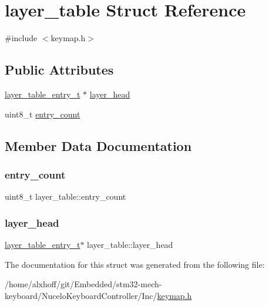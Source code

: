 \hypertarget{structlayer__table}{}\section{layer\+\_\+table Struct Reference}
\label{structlayer__table}


{\ttfamily \#include $<$keymap.\+h$>$}

\subsection*{Public Attributes}
\begin{DoxyCompactItemize}
\item 
\hyperlink{keymap_8h_ab39f612aa4dc85545562fc906ed5f100}{layer\+\_\+table\+\_\+entry\+\_\+t} $\ast$ \hyperlink{structlayer__table_aca57f81e89c42abcc37efffb16144630}{layer\+\_\+head}
\item 
uint8\+\_\+t \hyperlink{structlayer__table_ac2f160ce6c38b3565fb92e339a2ec7e4}{entry\+\_\+count}
\end{DoxyCompactItemize}


\subsection{Member Data Documentation}
\mbox{\label{structlayer__table_ac2f160ce6c38b3565fb92e339a2ec7e4}} 
\subsubsection{\texorpdfstring{entry\+\_\+count}{entry\_count}}
{\footnotesize\ttfamily uint8\+\_\+t layer\+\_\+table\+::entry\+\_\+count}

\mbox{\label{structlayer__table_aca57f81e89c42abcc37efffb16144630}} 
\subsubsection{\texorpdfstring{layer\+\_\+head}{layer\_head}}
{\footnotesize\ttfamily \hyperlink{keymap_8h_ab39f612aa4dc85545562fc906ed5f100}{layer\+\_\+table\+\_\+entry\+\_\+t}$\ast$ layer\+\_\+table\+::layer\+\_\+head}



The documentation for this struct was generated from the following file\+:\begin{DoxyCompactItemize}
\item 
/home/alxhoff/git/\+Embedded/stm32-\/mech-\/keyboard/\+Nucelo\+Keyboard\+Controller/\+Inc/\hyperlink{keymap_8h}{keymap.\+h}\end{DoxyCompactItemize}
